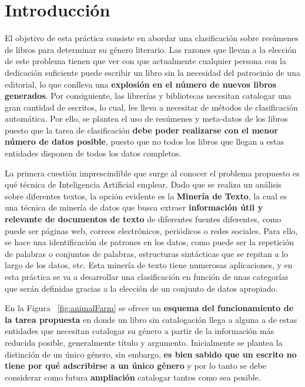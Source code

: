 \documentclass[12pt,a4paper, xcolor=table]{article}
\begin{document}
\listoftables

\newpage

\section{Introducción}

El objetivo de esta práctica consiste en abordar una clasificación sobre resúmenes de libros para determinar su género literario. Las razones que llevan a la elección de este problema tienen que ver con que actualmente cualquier persona con la dedicación suficiente puede escribir un libro sin la necesidad del patrocinio de una editorial, lo que conlleva una \textbf{explosión en el número de nuevos libros generados}. Por consiguiente, las librerías y bibliotecas necesitan catalogar una gran cantidad de escritos, lo cual, les lleva a necesitar de métodos de clasificación automática. Por ello, se plantea el uso de resúmenes y meta-datos de los libros puesto que la tarea de clasificación \textbf{debe poder realizarse con el menor número de datos posible}, puesto que no todos los libros que llegan a estas entidades disponen de todos los datos completos.

\vspace{3mm}

La primera cuestión imprescindible que surge al conocer el problema propuesto es qué técnica de Inteligencia Artificial emplear. Dado que se realiza un análisis sobre diferentes textos, la opción evidente es la \textbf{Minería de Texto}, la cual es una técnica de minería de datos que busca extraer \textbf{información útil y relevante de documentos de texto} de diferentes fuentes diferentes, como puede ser páginas web,
correos electrónicos, periódicos o redes sociales. Para ello, se hace una identificación de patrones en los datos, como puede ser la repetición de palabras o conjuntos de palabras, estructuras sintácticas que se repitan a lo largo de los datos, etc. Esta minería de texto tiene numerosas aplicaciones, y en esta práctica se va a desarrollar una clasificación en función de unas categorías que serán definidas gracias a la elección de un conjunto de datos apropiado.

\vspace{3mm}

En la Figura ~\ref{fig:animalFarm} se ofrece un \textbf{esquema del funcionamiento de la tarea propuesta} en donde un libro sin catalogación llega a alguna a de estas entidades que necesitan catalogar su género a partir de la información más reducida posible, generalmente título y argumento. Inicialmente se plantea la distinción de un único género, sin embargo, \textbf{es bien sabido que un escrito no tiene por qué adscribirse a un único género} y por lo tanto se debe considerar como futura \textbf{ampliación} catalogar tantos como sea posible.
\end{document}
